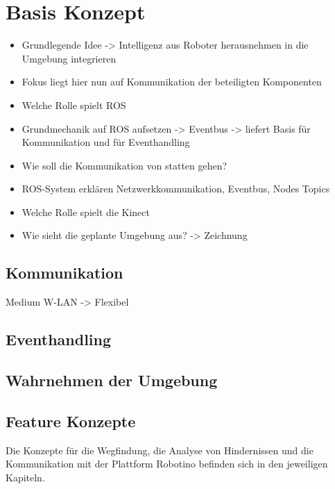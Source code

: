 \chapter{Basis Konzept}
	\begin{itemize}
	\item Grundlegende Idee -> Intelligenz aus Roboter herausnehmen in die Umgebung integrieren
	\item Fokus liegt hier nun auf Kommunikation der beteiligten Komponenten
	\item Welche Rolle spielt ROS
	\item Grundmechanik auf ROS aufsetzen -> Eventbus -> liefert Basis für Kommunikation und für Eventhandling

	\item Wie soll die Kommunikation von statten gehen?
	\item ROS-System erklären Netzwerkkommunikation, Eventbus, Nodes Topics

	\item Welche Rolle spielt die Kinect

	\item Wie sieht die geplante Umgebung aus? -> Zeichnung
	\end{itemize}
	\section{Kommunikation}
	Medium W-LAN -> Flexibel
	
	\section{Eventhandling}
	
	\section{Wahrnehmen der Umgebung}
	
	\section{Feature Konzepte}
	Die Konzepte für die Wegfindung, die Analyse von Hindernissen und die Kommunikation mit der Plattform Robotino befinden sich in den jeweiligen Kapiteln.